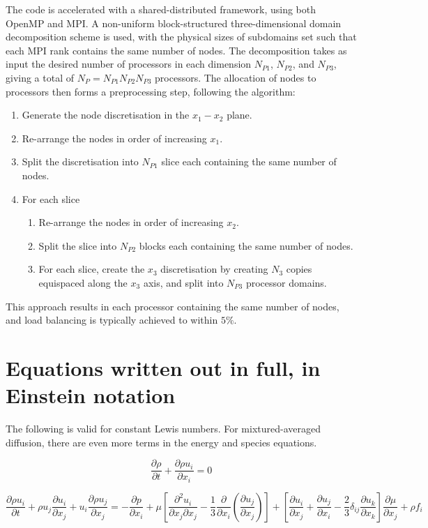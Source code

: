\documentclass[notitlepage]{revtex4-1}
\begin{document}
The code is accelerated with a shared-distributed framework, using both OpenMP and MPI. A non-uniform block-structured three-dimensional domain decomposition scheme is used, with the physical sizes of subdomains set such that each MPI rank contains the same number of nodes. The decomposition takes as input the desired number of processors in each dimension $N_{P1}$, $N_{P2}$, and $N_{P3}$, giving a total of $N_{P}=N_{P1}N_{P2}N_{P3}$ processors. The allocation of nodes to processors then forms a preprocessing step, following the algorithm:
\begin{enumerate}
\item Generate the node discretisation in the $x_{1}-x_{2}$ plane.
\item Re-arrange the nodes in order of increasing $x_{1}$.
\item Split the discretisation into $N_{P1}$ slice each containing the same number of nodes.
\item For each slice
\begin{enumerate}
\item Re-arrange the nodes in order of increasing $x_{2}$.
\item Split the slice into $N_{P2}$ blocks each containing the same number of nodes.
\item For each slice, create the $x_{3}$ discretisation by creating $N_{3}$ copies equispaced along the $x_{3}$ axis, and split into $N_{P3}$ processor domains.
\end{enumerate}
\end{enumerate}
This approach results in each processor containing the same number of nodes, and load balancing is typically achieved to within $5\%$. 

\appendix
\section{Equations written out in full, in Einstein notation}\label{fulleqns}

The following is valid for constant Lewis numbers. For mixtured-averaged diffusion, there are even more terms in the energy and species equations.

\begin{equation}\frac{\partial\rho}{\partial{t}}+\frac{\partial\rho{u}_{i}}{\partial{x}_{i}}=0\end{equation}

\begin{equation}\frac{\partial\rho{u}_{i}}{\partial{t}}+\rho{u}_{j}\frac{\partial{u}_{i}}{\partial{x}_{j}}+u_{i}\frac{\partial\rho{u}_{j}}{\partial{x}_{j}}=-\frac{\partial{p}}{\partial{x}_{i}}+\mu\left[\frac{\partial^{2}u_{i}}{\partial{x}_{j}\partial{x}_{j}}-\frac{1}{3}\frac{\partial}{\partial{x}_{i}}\left(\frac{\partial{u}_{j}}{\partial{x}_{j}}\right)\right]+\left[\frac{\partial{u}_{i}}{\partial{x}_{j}}+\frac{\partial{u}_{j}}{\partial{x}_{i}}-\frac{2}{3}\delta_{ij}\frac{\partial{u}_{k}}{\partial{x}_{k}}\right]\frac{\partial\mu}{\partial{x}_{j}}+\rho{f}_{i}\end{equation}
\end{document}
